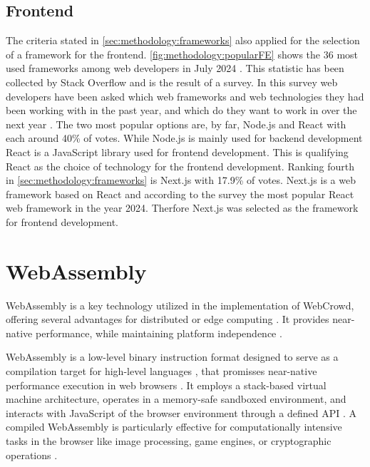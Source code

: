\subsection{Frontend}
\label{subsec:methodology:frameworks:frontend}
The criteria stated in \autoref{sec:methodology:frameworks} also applied for the selection of a framework for the frontend. \autoref{fig:methodology:popularFE} shows the 36 most used frameworks among web developers in July 2024 \cite{frontend:popularity}. This statistic has been collected by Stack Overflow and is the result of a survey. In this survey web developers have been asked which web frameworks and web technologies they had been working with in the past year, and which do they want to work in over the next year \cite{frontend:popularity}. The two most popular options are, by far, Node.js and React with each around 40\% of votes. While Node.js is mainly used for backend development React is a JavaScript library used for frontend development. This is qualifying React as the choice of technology for the frontend development. Ranking fourth in \autoref{sec:methodology:frameworks} is Next.js with 17.9\% of votes. Next.js is a web framework based on React \cite{methodology:nextjs} and according to the survey the most popular React web framework in the year 2024. Therfore Next.js was selected as the framework for frontend development.

\section{WebAssembly}
\label{sec:methodology:wasm}
WebAssembly \cite{methodology:wasm2} is a key technology utilized in the implementation of WebCrowd, offering several advantages for distributed or edge computing \cite{relatedwork:wasmedgecomputing}. It provides near-native performance, while maintaining platform independence \cite{methodology:wasm, relatedwork:wasmedgecomputing}. 

WebAssembly is a low-level binary instruction format designed to serve as a compilation target for high-level languages \cite{methodology:wasm, methodology:wasm2}, that promisses near-native performance execution in web browsers \cite{methodology:wasm, relatedwork:wasmedgecomputing}. It employs a stack-based virtual machine architecture, operates in a memory-safe sandboxed environment, and interacts with JavaScript of the browser environment through a defined \ac{API} \cite{methodology:wasm, methodology:wasm2, methodology:wasmdocu}. A compiled WebAssembly is particularly effective for computationally intensive tasks in the browser like image processing, game engines, or cryptographic operations \cite{methodology:wasm2}.

